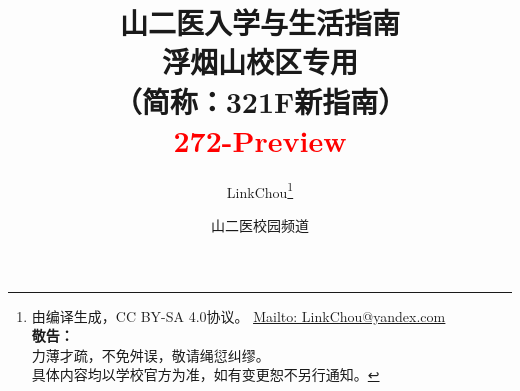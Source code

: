 

\title{%
\normalsize
{\Huge\textbf{山二医入学与生活指南}}\\[6pt]
{\large\textbf{浮烟山校区专用}}\\
（简称：321F新指南）\\[15pt]
{\large\textcolor{red}{272-Preview}}\vspace*{-25pt}}
\author{LinkChou\thanks{由\LaTeXe 编译生成，CC BY-SA 4.0协议。%
\uline{\href{Mailto:LinkChou@yandex.com}{Mailto: LinkChou@yandex.com}}\\%
\textbf{敬告：}\\%
\indent\indent 力薄才疏，不免舛误，敬请绳愆纠缪。\\%
\indent\indent 具体内容均以学校官方为准，如有变更恕不另行通知。}\and 山二医校园频道}
\date{\DTMnow}
\maketitle

\renewcommand{\thefootnote}{\arabic{footnote}}

\tableofcontents